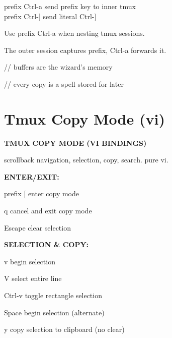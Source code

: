 \documentclass[11pt,a4paper,twoside]{book}
\begin{document}
\begin{codebox}
prefix Ctrl-a         send prefix key to inner tmux\\
prefix Ctrl-]         send literal Ctrl-]\\
\end{codebox}

Use prefix Ctrl-a when nesting tmux sessions.

The outer session captures prefix, Ctrl-a forwards it.

// buffers are the wizard's memory

// every copy is a spell stored for later


\vspace{16pt}

\section{Tmux Copy Mode (vi)}


\vspace{10pt}
{\large\bfseries\color{neoncyan} TMUX COPY MODE (VI BINDINGS)}\vspace{6pt}

scrollback navigation, selection, copy, search. pure vi.


\vspace{12pt}
{\bfseries\color{neonyellow} ENTER/EXIT:}\vspace{4pt}

\begin{codebox}
prefix [              enter copy mode\\
\end{codebox}

q                     cancel and exit copy mode

Escape                clear selection


\vspace{12pt}
{\bfseries\color{neonyellow} SELECTION \& COPY:}\vspace{4pt}

v                     begin selection

V                     select entire line

\begin{codebox}
Ctrl-v               toggle rectangle selection\\
\end{codebox}

Space                 begin selection (alternate)

y                     copy selection to clipboard (no clear)
\end{document}
